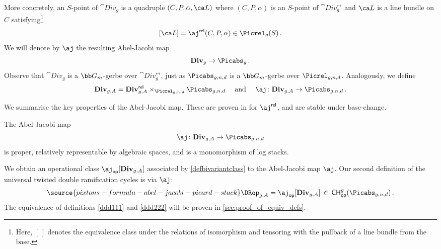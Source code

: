 More concretely, an $S$-point of $\cat{Div}_{g}$ is a quadruple $(C,P,\alpha,\ca L)$ where $(C, P, \alpha)$ is an $S$-point of $\cat{Div}^{\rel}_{g}$ and $\ca L$ is a line bundle on $C$ satisfying{\footnote{Here, $[\,]$ denotes the
equivalence class under the relations of isomorphism and tensoring with the pullback of a line bundle from the base. }}%
$$[\ca L] = \aj^{\rel}(C, P, \alpha)\in \Picrel_{g}(S)\, .$$
We will denote by $\aj$ the resulting Abel-Jacobi map
$$\cat{Div}_g \to \Picabs_{g}\, .$$
Observe that $\cat{Div}_g$ is a $\bb G_m$-gerbe over $\cat{Div}^{\rel}_{g}$, just as $\Picabs_{g,n,d}$ is a $\bb G_m$-gerbe over $\Picrel_{g,n, d}$.
Analogously,
we define
\begin{equation}
\cat{Div}_{g,A} = \cat{Div}^{\rel}_{g,A} \times_{\Picrel_{g,n,d}}\Picabs_{g,n,d}
\ \ \ \
\text{and}
\ \ \ \ \aj\colon \cat{Div}_{g,A} \to \Picabs_{g,n,d}\, .
\end{equation}





We summarise the key properties of the Abel-Jacobi map. These are proven
in \cite{Marcus2017Logarithmic-com} for $\aj^{\rel}$, and are stable under base-change.
\begin{proposition}
\notready
The Abel-Jacobi map
$$\aj\colon \cat{Div}_{g,A} \to \Picabs_{g,n,d}$$
is proper, relatively representable by algebraic spaces, and is a monomorphism of log stacks.
\end{proposition}


We obtain an operational class $\aj_{\mathsf{op}}[\cat{Div}_{g,A}]$ associated by \cref{defbivariantclass} to the Abel-Jacobi map $\aj$.
Our second definition of the universal twisted double ramification
cycles is via $\aj$:
\begin{equation}\label{ddd222}
\source{pixtons-formula-abel-jacobi-picard-stack}
\DRop_{g,A} = \aj_{\mathsf{op}}[\cat{Div}_{g,A}] \, \in\,
\mathsf{CH}^g_{\mathsf{op}}(\Picabs_{g,n,d})
\, .
\end{equation}
The equivalence of
definitions \eqref{ddd111} and \eqref{ddd222} will be proven in \cref{sec:proof_of_equiv_defs}.

